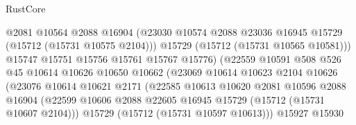 \begin{lexlean}{RustCore}
\begin{coremodule}
                                      @2081
                                      @10564
                                      @2088
                                      @16904
                                      (@23030
                                        @10574
                                        @2088
                                        @23036
                                        @16945
                                        @15729
                                        (@15712 (@15731 @10575 @2104)))
                                      @15729
                                      (@15712 (@15731 @10565 @10581)))
                                    @15747
                                    @15751
                                    @15756
                                    @15761
                                    @15767
                                    @15776)
                                  (@22559
                                    @10591
                                    @508
                                    @526
                                    @45
                                    @10614
                                    @10626
                                    @10650
                                    @10662
                                    (@23069
                                      @10614
                                      @10623
                                      @2104
                                      @10626
                                      (@23076
                                        @10614
                                        @10621
                                        @2171
                                        (@22585
                                          @10613
                                          @10620
                                          @2081
                                          @10596
                                          @2088
                                          @16904
                                          (@22599
                                            @10606
                                            @2088
                                            @22605
                                            @16945
                                            @15729
                                            (@15712 (@15731 @10607 @2104)))
                                          @15729
                                          (@15712 (@15731 @10597 @10613)))
                                        @15927
                                        @15930

\end{coremodule}
\end{lexlean}
